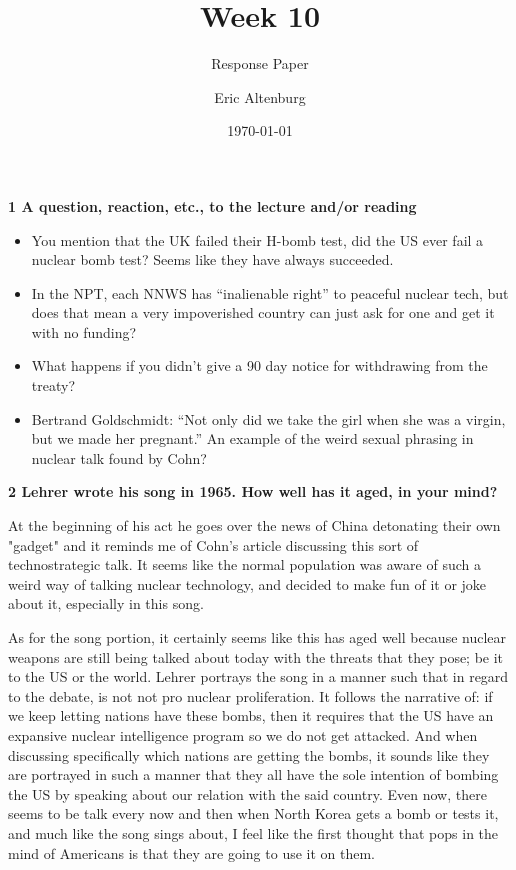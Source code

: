 \documentclass[12pt]{turabian-researchpaper}
\title{Week 10}
\subtitle{Response Paper}
\author{Eric Altenburg}
\date{\today}
\newcommand\question[2]{\noindent\textbf{#1 \quad #2}}
\begin{document}
\maketitle

\question{1}{A question, reaction, etc., to the lecture and/or reading}

	\begin{itemize}
		\item You mention that the UK failed their H-bomb test, did the US ever fail a nuclear bomb test? Seems like they have always succeeded.
		\item In the NPT, each NNWS has “inalienable right” to peaceful nuclear tech, but does that mean a very impoverished country can just ask for one and get it with no funding?
		\item What happens if you didn’t give a 90 day notice for withdrawing from the treaty?
		\item Bertrand Goldschmidt: “Not only did we take the girl when she was a virgin, but we made her pregnant.” An example of the weird sexual phrasing in nuclear talk found by Cohn?
	\end{itemize}

\question{2}{Lehrer wrote his song in 1965. How well has it aged, in your mind?}

	At the beginning of his act he goes over the news of China detonating their own "gadget" and it reminds me of Cohn's article discussing this sort of technostrategic talk. It seems like the normal population was aware of such a weird way of talking nuclear technology, and decided to make fun of it or joke about it, especially in this song.

	As for the song portion, it certainly seems like this has aged well because nuclear weapons are still being talked about today with the threats that they pose; be it to the US or the world. Lehrer portrays the song in a manner such that in regard to the debate, is not not pro nuclear proliferation. It follows the narrative of: if we keep letting nations have these bombs, then it requires that the US have an expansive nuclear intelligence program so we do not get attacked. And when discussing specifically which nations are getting the bombs, it sounds like they are portrayed in such a manner that they all have the sole intention of bombing the US by speaking about our relation with the said country. Even now, there seems to be talk every now and then when North Korea gets a bomb or tests it, and much like the song sings about, I feel like the first thought that pops in the mind of Americans is that they are going to use it on them.
\end{document}
